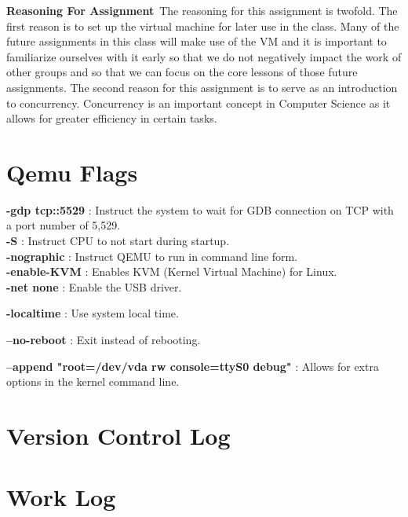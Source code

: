 \documentclass[letterpaper,10pt]{article}
\begin{document}
	\textbf{Reasoning For Assignment}\
		The reasoning for this assignment is twofold. The first reason is to set up the virtual machine for later use in the class. Many of the future assignments in this class will make use of the VM and it is important to familiarize ourselves with it early so that we do not negatively impact the work of other groups and so that we can focus on the core lessons of those future assignments. The second reason for this assignment is to serve as an introduction to concurrency. Concurrency is an important concept in Computer Science as it allows for greater efficiency in certain tasks.\\
		
	 

	
	\clearpage
	\section{Qemu Flags}
	\textbf{-gdp tcp::5529} : Instruct the system to wait for GDB connection on TCP with a port number of 5,529. \\
	
	\textbf{-S} : Instruct CPU to not start during startup. \\
	
	\textbf{-nographic} : Instruct QEMU to run in command line form. \\
	
	\textbf{-enable-KVM} : Enables KVM (Kernel Virtual Machine) for Linux. \\
	
	\textbf{-net none} : Enable the USB driver.
	
	\textbf{-localtime} : Use system local time.
	
	\textbf{--no-reboot} : Exit instead of rebooting.
	
	\textbf{--append "root=/dev/vda rw console=ttyS0 debug"} : Allows for extra options in the kernel command line. 
	
	
	
	\clearpage
	\section{Version Control Log}
	
	\clearpage
	\section{Work Log}
	

	
	
\end{document}
